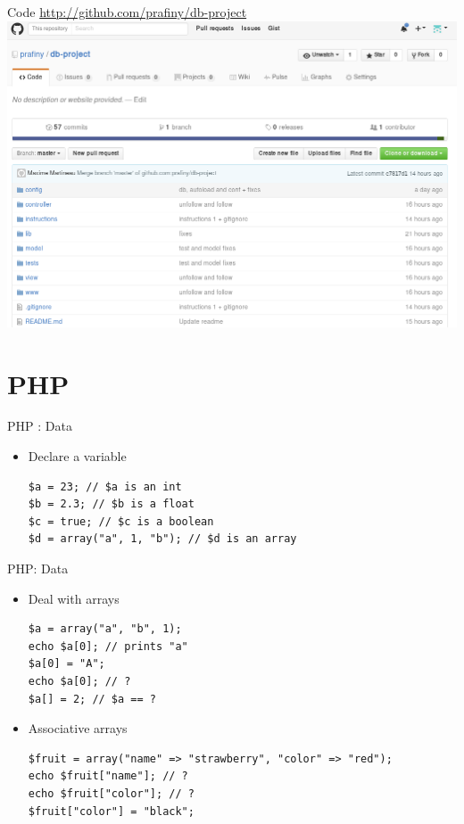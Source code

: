 \documentclass{beamer}
\begin{document}
\begin{frame}{Code}
\center
    \url{http://github.com/prafiny/db-project}
    \includegraphics[scale=0.2]{images/project.png}  
\end{frame}

\section{PHP}

\begin{frame}[fragile]{PHP : Data}
    \begin{itemize}
        \item Declare a variable
        \begin{lstlisting}
$a = 23; // $a is an int
$b = 2.3; // $b is a float
$c = true; // $c is a boolean
$d = array("a", 1, "b"); // $d is an array
        \end{lstlisting}
    \end{itemize}
\end{frame}

\begin{frame}[fragile]{PHP: Data}
    \begin{itemize}
        \item Deal with arrays
        \begin{lstlisting}
$a = array("a", "b", 1);
echo $a[0]; // prints "a"
$a[0] = "A";
echo $a[0]; // ?
$a[] = 2; // $a == ?
        \end{lstlisting}
        \item Associative arrays
        \begin{lstlisting}
$fruit = array("name" => "strawberry", "color" => "red");
echo $fruit["name"]; // ?
echo $fruit["color"]; // ?
$fruit["color"] = "black";
        \end{lstlisting}
    \end{itemize}
\end{frame}
\end{document}
